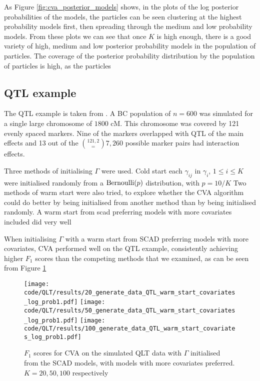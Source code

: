 \documentclass{amsart}[12pt]
\begin{document}
As Figure \ref{fig:cva_posterior_models} shows, 
in the plots of the log posterior probabilities of the models, the particles can be seen clustering at the
highest probability models first, then spreading through the medium and low probability models. From these
plots we can see that once $K$ is high enough, there is a good variety of high, medium and low posterior
probability models in the population of particles. The coverage of the posterior probability distribution
by the population of particles is high, as the particles 

\subsection{QTL example}
The QTL example is taken from \cite{Xu2007}. A BC population of $n=600$ was simulated for a single large
chromosome of $1800$ cM. This chromosome was covered by 121 evenly spaced markers. Nine of the markers
overlapped with QTL of the main effects and 13 out of the $\binom{121, 2} = 7,260$ possible marker pairs had
interaction effects.

Three methods of initialising $\Gamma$ were used.
Cold start each $\gamma_{ij}$ in $\gamma_i$, $1 \leq i \leq K$ were initialised randomly from a
$\text{Bernoulli} (p)$ distribution, with $p = 10 / K$
Two methods of warm start were also tried, to explore whether the CVA algorithm could do better by being
initialised from another method than by being initialised randomly. 
A warm start from scad preferring models with more covariates included did very well

When initialising $\Gamma$ with a warm start from SCAD preferring models with more covariates,
CVA performed well on the QTL example, consistently achieving higher $F_1$ scores than the competing methods
that we examined, as can be seen from Figure \ref{fig:QLT_warm_start_covariates}

\begin{figure}\label{fig:QLT_warm_start_covariates}
\caption{$F_1$ scores for CVA on the simulated QLT data with $\Gamma$ initialised from the SCAD models, with
models with more covariates preferred. $K=20, 50, 100$ respectively}
\texttt{[image: code/QLT/results/20\_generate\_data\_QTL\_warm\_start\_covariates\_log\_prob1.pdf]}
\texttt{[image: code/QLT/results/50\_generate\_data\_QTL\_warm\_start\_covariates\_log\_prob1.pdf]}
\texttt{[image: code/QLT/results/100\_generate\_data\_QTL\_warm\_start\_covariates\_log\_prob1.pdf]}
\end{figure}
\end{document}
